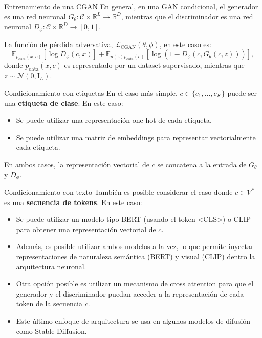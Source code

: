 \documentclass{beamer}
\newcommand{\R}{\mathbb{R}}
\begin{document}
\begin{frame}{Entrenamiento de una CGAN}
    En general, en una GAN condicional, el generador es una red neuronal $G_\theta:\mathcal{C}\times\R^L\to\R^D$, mientras que el discriminador es una red neuronal $D_\phi:\mathcal{C}\times\R^D\to[0,1]$.

    La función de pérdida adversativa, $\mathcal{L}_\text{CGAN}(\theta,\phi)$, en este caso es:
    \begin{equation*}
        \mathbb{E}_{p_\text{data}(x,c)}\left[\log D_\phi(c,x)\right]+\mathbb{E}_{p(z)p_\text{data}(c)}\left[\log\left(1-D_\phi(c,G_\theta(c,z))\right)\right],
    \end{equation*}
    donde $p_\text{data}(x,c)$ es representado por un dataset supervisado, mientras que $z\sim\mathcal{N}(0,\text{I}_L)$.
\end{frame}

\begin{frame}{Condicionamiento con etiquetas}
    En el caso más simple, $c\in\{c_1,\ldots,c_K\}$ puede ser una \textbf{etiqueta de clase}. En este caso:
    \begin{itemize}
        \item Se puede utilizar una representación one-hot de cada etiqueta.
        \item Se puede utilizar una matriz de embeddings para representar vectorialmente cada etiqueta.
    \end{itemize}
    En ambos casos, la representación vectorial de $c$ se concatena a la entrada de $G_\theta$ y $D_\phi$.
\end{frame}

\begin{frame}{Condicionamiento con texto}
    También es posible considerar el caso donde $c\in\mathcal{V}^*$ es una \textbf{secuencia de tokens}. En este caso:
    \begin{itemize}
        \item Se puede utilizar un modelo tipo BERT (usando el token $\text{<CLS>}$) o CLIP para obtener una representación vectorial de $c$.
        \item Además, es posible utilizar ambos modelos a la vez, lo que permite inyectar representaciones de naturaleza semántica (BERT) y visual (CLIP) dentro la arquitectura neuronal.
        \item Otra opción posible es utilizar un mecanismo de cross attention para que el generador y el discriminador puedan acceder a la representación de cada token de la secuencia $c$.
        \item Este último enfoque de arquitectura se usa en algunos modelos de difusión como Stable Diffusion.
    \end{itemize}
\end{frame}
\end{document}
